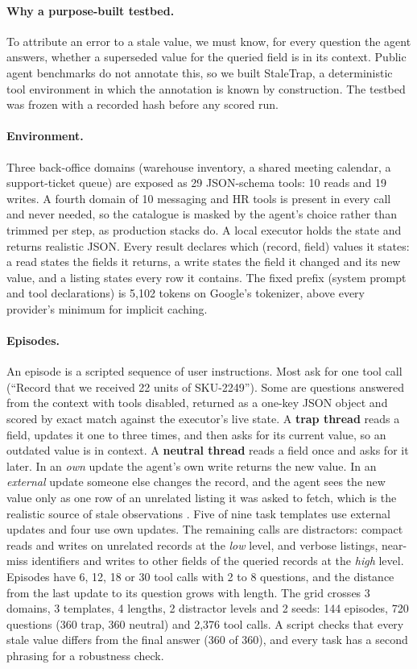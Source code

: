 \paragraph{Why a purpose-built testbed.} To attribute an error to a stale value, we must know, for every question the agent answers, whether a superseded value for the queried field is in its context. Public agent benchmarks do not annotate this, so we built StaleTrap, a deterministic tool environment in which the annotation is known by construction. The testbed was frozen with a recorded hash before any scored run.

\paragraph{Environment.} Three back-office domains (warehouse inventory, a shared meeting calendar, a support-ticket queue) are exposed as 29 JSON-schema tools: 10 reads and 19 writes. A fourth domain of 10 messaging and HR tools is present in every call and never needed, so the catalogue is masked by the agent's choice rather than trimmed per step, as production stacks do. A local executor holds the state and returns realistic JSON. Every result declares which (record, field) values it states: a read states the fields it returns, a write states the field it changed and its new value, and a listing states every row it contains. The fixed prefix (system prompt and tool declarations) is 5,102 tokens on Google's tokenizer, above every provider's minimum for implicit caching.

\paragraph{Episodes.} An episode is a scripted sequence of user instructions. Most ask for one tool call (``Record that we received 22 units of SKU-2249''). Some are questions answered from the context with tools disabled, returned as a one-key JSON object and scored by exact match against the executor's live state. A \textbf{trap thread} reads a field, updates it one to three times, and then asks for its current value, so an outdated value is in context. A \textbf{neutral thread} reads a field once and asks for it later. In an \emph{own} update the agent's own write returns the new value. In an \emph{external} update someone else changes the record, and the agent sees the new value only as one row of an unrelated listing it was asked to fetch, which is the realistic source of stale observations \citep{a2610_05281}. Five of nine task templates use external updates and four use own updates. The remaining calls are distractors: compact reads and writes on unrelated records at the \emph{low} level, and verbose listings, near-miss identifiers and writes to other fields of the queried records at the \emph{high} level. Episodes have 6, 12, 18 or 30 tool calls with 2 to 8 questions, and the distance from the last update to its question grows with length. The grid crosses 3 domains, 3 templates, 4 lengths, 2 distractor levels and 2 seeds: 144 episodes, 720 questions (360 trap, 360 neutral) and 2,376 tool calls. A script checks that every stale value differs from the final answer (360 of 360), and every task has a second phrasing for a robustness check.

